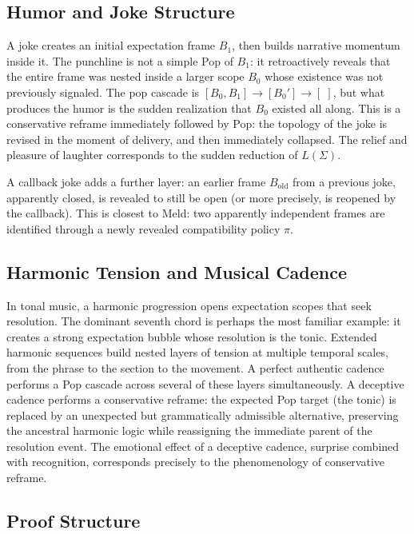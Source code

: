 \documentclass[12pt, a4paper]{article}
\theoremstyle{plain}
\theoremstyle{definition}
\theoremstyle{remark}
\begin{document}
\subsection{Humor and Joke Structure}

A joke creates an initial expectation frame $B_1$, then builds narrative
momentum inside it. The punchline is not a simple Pop of $B_1$: it
retroactively reveals that the entire frame was nested inside a larger scope
$B_0$ whose existence was not previously signaled. The pop cascade
is $[B_0, B_1] \to [B_0'] \to [\;]$, but what produces the humor is the
sudden realization that $B_0$ existed all along. This is a conservative
reframe immediately followed by Pop: the topology of the joke is revised
in the moment of delivery, and then immediately collapsed. The relief and
pleasure of laughter corresponds to the sudden reduction of $L(\Sigma)$.

A callback joke adds a further layer: an earlier frame $B_{\text{old}}$ from
a previous joke, apparently closed, is revealed to still be open (or more
precisely, is reopened by the callback). This is closest to Meld: two
apparently independent frames are identified through a newly revealed
compatibility policy $\pi$.

\subsection{Harmonic Tension and Musical Cadence}

In tonal music, a harmonic progression opens expectation scopes that seek
resolution. The dominant seventh chord is perhaps the most familiar example:
it creates a strong expectation bubble whose resolution is the tonic. Extended
harmonic sequences build nested layers of tension at multiple temporal scales,
from the phrase to the section to the movement. A perfect authentic cadence
performs a Pop cascade across several of these layers simultaneously. A deceptive
cadence performs a conservative reframe: the expected Pop target (the tonic)
is replaced by an unexpected but grammatically admissible alternative,
preserving the ancestral harmonic logic while reassigning the immediate parent
of the resolution event. The emotional effect of a deceptive cadence, surprise
combined with recognition, corresponds precisely to the phenomenology of
conservative reframe.

\subsection{Proof Structure}
\end{document}
